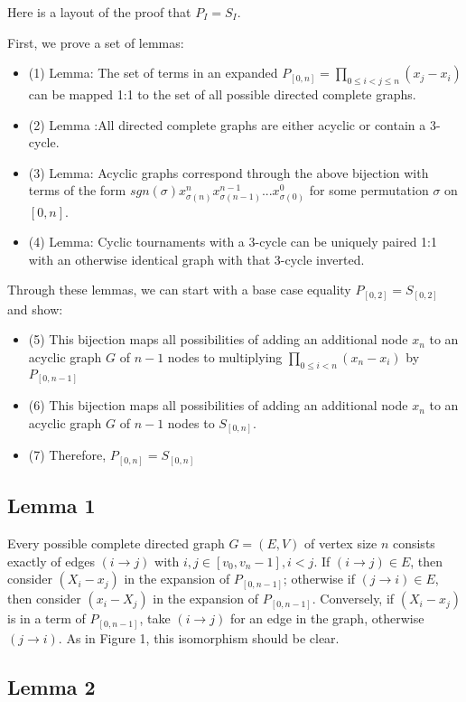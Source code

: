 \documentclass[11pt, oneside]{article} 	%
\begin{document}
Here is a layout of the proof that $P_I=S_I$.

First, we prove a set of lemmas:
\begin{itemize}
\item (1) Lemma: The set of terms in an expanded $P_{[0,n]} =\prod_{0 \leq i < j \leq n}(x_j - x_i)$ can be mapped 1:1 to the set of all possible directed complete graphs.
\item (2) Lemma :All directed complete graphs are either acyclic or contain a 3-cycle.
\item (3) Lemma: Acyclic graphs correspond through the above bijection with terms of the form $sgn(\sigma) x_{\sigma(n)}^nx_{\sigma(n-1)}^{n-1}  ... x_{\sigma(0)}^{0}$ for some permutation $\sigma$ on $[0,n]$.
\item (4) Lemma: Cyclic tournaments with a 3-cycle can be uniquely paired 1:1 with an otherwise identical graph with that 3-cycle inverted.
\end{itemize}

Through these lemmas, we can start with a base case equality $P_{[0,2]} = S_{[0,2]}$ and show:
\begin{itemize}
\item (5) This bijection maps all possibilities of adding an additional node $x_n$ to an acyclic graph $G$ of $n-1$ nodes to multiplying $\prod_{0 \leq i < n}(x_n-x_i)$ by $P_{[0,n-1]}$
\item (6) This bijection maps all possibilities of adding an additional node $x_n$ to an acyclic graph $G$ of $n-1$ nodes to $S_{[0,n]}$.
\item (7) Therefore, $P_{[0,n]} = S_{[0,n]}$
\end{itemize}

\subsection{Lemma 1}

Every possible complete directed graph  $G = (E,V)$ of vertex size $n$  consists exactly of edges $(i \rightarrow j)$ with $i, j \in [v_0, v_n-1], i < j$.  If $(i \rightarrow j) \in E$, then consider $(X_i - x_j)$ in the expansion of $P_{[0, n-1]}$; otherwise if $(j \rightarrow i) \in E$, then consider $(x_i - X_j)$ in the expansion of $P_{[0, n-1]}$.  Conversely, if $(X_i - x_j)$ is in a term of $P_{[0, n-1]}$, take $(i \rightarrow j)$ for an edge in the graph, otherwise $(j \rightarrow i)$.  As in Figure 1, this isomorphism should be clear.

\subsection{Lemma 2}
\end{document}
